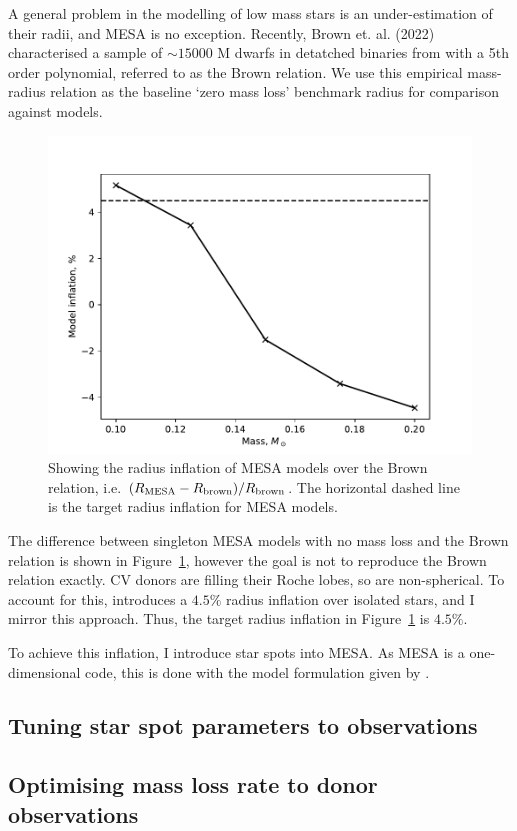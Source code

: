 A general problem in the modelling of low mass stars is an under-estimation of their radii, and MESA is no exception. Recently, Brown et. al. (2022) characterised a sample of $\sim 15000$ M dwarfs in detatched binaries from \citet{parsons2018} with a 5th order polynomial, referred to as the Brown relation. We use this empirical mass-radius relation as the baseline `zero mass loss' benchmark radius for comparison against models.
\begin{figure}
    \centering
    \includegraphics[]{figures/modelling/MESA_inflation_over_brown.pdf}
    \caption{Showing the radius inflation of MESA models over the Brown relation, i.e. $(R_{\rm MESA} - R_{\rm brown}) / R_{\rm brown}$. The horizontal dashed line is the target radius inflation for MESA models.}
    \label{fig:modelling:MESA inflation over Brown relation}
\end{figure}
The difference between singleton MESA models with no mass loss and the Brown relation is shown in Figure~\ref{fig:modelling:MESA inflation over Brown relation}, however the goal is not to reproduce the Brown relation exactly.
CV donors are filling their Roche lobes, so are non-spherical. To account for this, \citet{knigge11} introduces a $4.5\%$ radius inflation over isolated stars, and I mirror this approach. Thus, the target radius inflation in Figure~\ref{fig:modelling:MESA inflation over Brown relation} is $4.5\%$.

To achieve this inflation, I introduce star spots into MESA. As MESA is a one-dimensional code, this is done with the model formulation given by \citet{sommers2015}.



\subsection{Tuning star spot parameters to observations}\label{sect:modelling:tuning star spots to observations}


\subsection{Optimising mass loss rate to donor observations}
